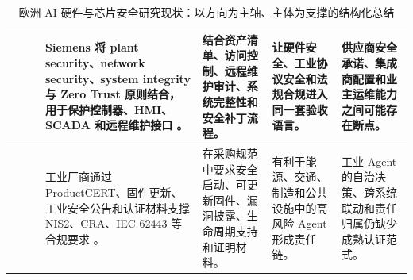 \begin{table}[htbp]
\begin{tabularx}{\textwidth}{|>{\centering\arraybackslash}p{0.9cm}|>{\centering\arraybackslash}p{1.8cm}|>{\raggedright\arraybackslash}p{2.1cm}|X|X|X|X|}
\cline{4-7}
& & &
Siemens 将 plant security、network security、system integrity 与 Zero Trust 原则结合，用于保护控制器、HMI、SCADA 和远程维护接口 \cite{siemensindustrialcyber2026}。 &
结合资产清单、访问控制、远程维护审计、系统完整性和安全补丁流程。 &
让硬件安全、工业协议安全和法规合规进入同一套验收语言。 &
供应商安全承诺、集成商配置和业主运维能力之间可能存在断点。 \\
\cline{4-7}
& & &
工业厂商通过 ProductCERT、固件更新、工业安全公告和认证材料支撑 NIS2、CRA、IEC 62443 等合规要求 \cite{siemensindustrialcyber2026,infineonoptiga2026}。 &
在采购规范中要求安全启动、可更新固件、漏洞披露、生命周期支持和证明材料。 &
有利于能源、交通、制造和公共设施中的高风险 Agent 形成责任链。 &
工业 Agent 的自治决策、跨系统联动和责任归属仍缺少成熟认证范式。 \\
\hline
\end{tabularx}
\caption{欧洲 AI 硬件与芯片安全研究现状：以方向为主轴、主体为支撑的结构化总结}
\label{tab:europe-ai-hardware-security-formatted}
\end{table}
